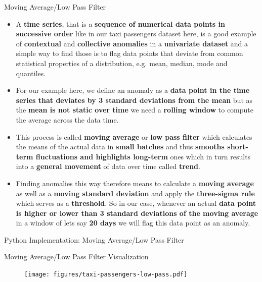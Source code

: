 \documentclass[document.tex]{subfiles}
\begin{document}
    \begin{frame}{Moving Average/Low Pass Filter}
        \begin{itemize}
            \item A \textbf{time series}, that is a \textbf{sequence of numerical data points in successive order} like in our taxi passengers dataset here, is a good example of \textbf{contextual} and \textbf{collective anomalies} in a \textbf{univariate dataset} and a simple way to find those is to flag data points that deviate from common statistical properties of a distribution, e.g. mean, median, mode and quantiles.
            \item For our example here, we define an anomaly as a \textbf{data point in the time series that deviates by 3 standard deviations from the mean} but as the \textbf{mean is not static over time} we need a \textbf{rolling window} to compute the average across the data time.
            \item This process is called \textbf{moving average} or \textbf{low pass filter} which calculates the means of the actual data in \textbf{small batches} and thus \textbf{smooths short-term fluctuations and highlights long-term} ones which in turn results into a \textbf{general movement} of data over time called \textbf{trend}.
            \item Finding anomalies this way therefore means to calculate a \textbf{moving average} as well as a \textbf{moving standard deviation} and apply the \textbf{three-sigma rule} which serves as a \textbf{threshold}. So in our case, whenever an actual \textbf{data point is higher or lower than 3 standard deviations of the moving average} in a window of lets say \textbf{20 days} we will flag this data point as an anomaly.
        \end{itemize}
    \end{frame}
    
    \begin{frame}{Python Implementation: Moving Average/Low Pass Filter}
        
    \end{frame}

    \begin{frame}{Moving Average/Low Pass Filter Visualization}
        \begin{figure}
            \label{fig:taxi-passengers-low-pass}
            \texttt{[image: figures/taxi-passengers-low-pass.pdf]}
        \end{figure}
    \end{frame}
\end{document}
